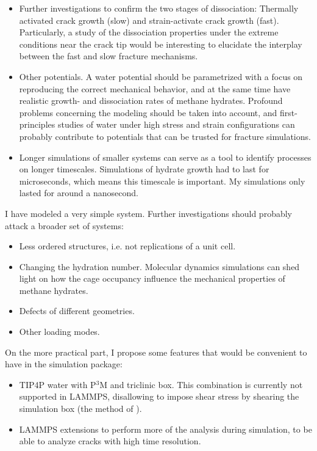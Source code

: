 \begin{itemize}
\item Further investigations to confirm the two stages of dissociation: Thermally activated crack growth (slow) and strain-activate crack growth (fast). Particularly, a study of the dissociation properties under the extreme conditions near the crack tip would be interesting to elucidate the interplay between the fast and slow fracture mechanisms.
\item Other potentials. A water potential should be parametrized with a focus on reproducing the correct mechanical behavior, and at the same time have realistic growth- and dissociation rates of methane hydrates. Profound problems concerning the modeling should be taken into account, and first-principles studies of water under high stress and strain configurations can probably contribute to potentials that can be trusted for fracture simulations. 
\item Longer simulations of smaller systems can serve as a tool to identify processes on longer timescales. Simulations of hydrate growth had to last for microseconds, which means this timescale is important. My simulations only lasted for around a nanosecond.
\end{itemize}

I have modeled a very simple system. Further investigations should probably attack a broader set of systems:

\begin{itemize}
\item Less ordered structures, i.e. not replications of a unit cell.
\item Changing the hydration number. Molecular dynamics simulations can shed light on how the cage occupancy influence the mechanical properties of methane hydrates.
\item Defects of different geometries.
\item Other loading modes.
\end{itemize}
%

On the more practical part, I propose some features that would be convenient to have in the simulation package:
\begin{itemize}
\item TIP4P water with P$^3$M and triclinic box. This combination is currently not supported in LAMMPS, disallowing to impose shear stress by shearing the simulation box (the method of \citet{Parrinello1981}).
\item LAMMPS extensions to perform more of the analysis during simulation, to be able to analyze cracks with high time resolution.
\end{itemize}
 
